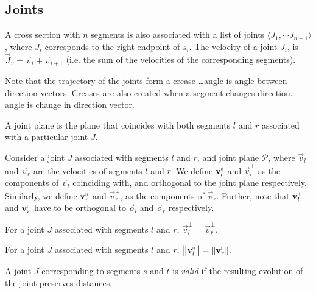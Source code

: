 \subsection{Joints}
\label{sec:joints}

\begin{definition}
\label{def:joints}
A cross section with $n$ segments is also associated with a list of joints
$ \langle J_1,\cdots J_{n-1} \rangle$, where $J_i$ corresponds to the right endpoint of $s_i$.
The velocity of a joint $J_i$, is $\vec J_v = \vec v_i+\vec v_{i+1}$
(i.e. the sum of the velocities of the corresponding segments).
\end{definition}
\begin{definition}
\label{def:creases}
Note that the trajectory of the joints form a crease \ldots angle is angle between direction vectors.
Creases are also created when a segment changes direction\ldots angle is change in direction vector.
\end{definition}

\begin{definition}
\label{def:joint_plane}
A joint plane is the plane that coincides with both segments $l$ and $r$ associated with a particular joint $J$.
\end{definition}

\begin{definition}
\label{def:joint_plane_velocity}
Consider a joint $J$ associated with segments $l$ and $r$, and joint plane $\mathcal P$,
where $\vec v_l$ and $\vec v_r$ are the velocities of segments $l$ and $r$.
We define $\vec v_l^\shortparallel$ and $\vec v_l^\perp$ as the components of $\vec v_l$ coinciding with,
and orthogonal to the joint plane respectively.
Similarly, we define $\vec v_r^\shortparallel$ and $\vec v_r^\perp$, as the components of $\vec v_r$.
Further, note that $\vec v_l^\shortparallel$ and $\vec v_r^\shortparallel$
have to be orthogonal to $\vec o_l$ and $\vec o_r$ respectively.
\end{definition}

\begin{claim}
\label{clm:joint_orthogonal_velocity}
For a joint $J$ associated with segments $l$ and $r$, $\vec v_l^\perp = \vec v_r^\perp$.
\end{claim}

\begin{corollary}
\label{cor:joint_plane_velocity}
For a joint $J$ associated with segments $l$ and $r$,
$ \left\| \vec v_l^\shortparallel\right\| = \left\| \vec v_r^\shortparallel\right\|$.
\end{corollary}

\begin{claim}
\label{clm:valid_joint}
A joint $J$ corresponding to segments $s$ and $t$ is \emph{valid}
if the resulting evolution of the joint preserves distances.
\end{claim}
